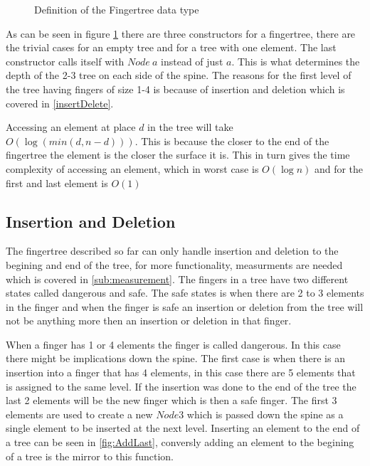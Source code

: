 \begin{figure}[h!]

\caption{Definition of the Fingertree data type \label{fig:DataTypeFingertree}}
\end{figure}

As can be seen in figure \cref{fig:DataTypeFingertree} there are three constructors
for a fingertree, there are the trivial cases for an empty tree and for a tree
with one element. The last constructor calls itself with $Node~a$ instead of
just $a$. This is what determines the depth of the 2-3 tree on each side of the
spine. The reasons for the first level of the tree having fingers of size 1-4 is
because of insertion and deletion which is covered in \cref{insertDelete}.

Accessing an element at place $d$ in the tree will take $O(\log(min(d,n-d)))$. This
is because the closer to the end of the fingertree the element is the closer the
surface it is. This in turn gives the time complexity of accessing an element,
which in worst case is $O(\log n)$ and for the first and last element is $O(1)$

\subsection{Insertion and Deletion \label{insertDelete}}
The fingertree described so far can only handle insertion and deletion to the
begining and end of the tree, for more functionality, measurments are needed
which is covered in \cref{sub:measurement}.
The fingers in a tree have two different states called dangerous and safe. The
safe states is when there are 2 to 3 elements in the finger and when the finger
is safe an insertion or deletion from the tree will not be anything more then an
insertion or deletion in that finger.

When a finger has 1 or 4 elements the finger is called dangerous. In this case
there might be implications down the spine. The first case is when there is an
insertion into a finger that has 4 elements, in this case there are 5 elements
that is assigned to the same level. If the insertion was done to the end of the
tree the last 2 elements will be the new finger which is then a safe finger. The
first 3 elements are used to create a new $Node3$ which is passed down the spine
as a single element to be inserted at the next level. Inserting an element to
the end of a tree can be seen in \cref{fig:AddLast}, conversly adding an element
to the begining of a tree is the mirror to this function.

